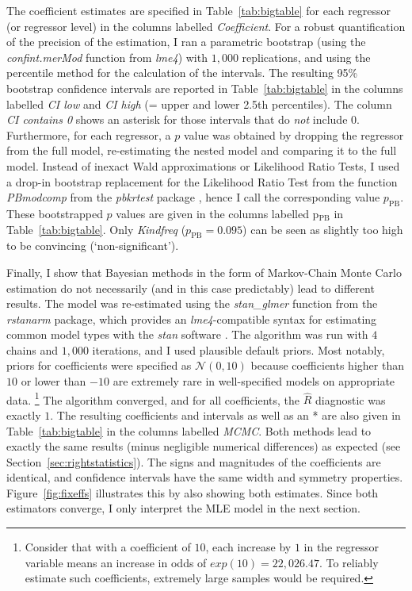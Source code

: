 \documentclass[USenglish]{article}
\newcommand{\Sub}[1]{\ensuremath{\mathrm{_{#1}}}}
\newcommand{\mpPB}{\ensuremath{p_{\text{PB}}}}
\begin{document}
The coefficient estimates are specified in Table~\ref{tab:bigtable} for each regressor (or regressor level) in the columns labelled \textit{Coefficient}.
For a robust quantification of the precision of the estimation, I ran a parametric bootstrap (using the \textit{confint.merMod} function from \textit{lme4}) with $1,000$ replications, and using the percentile method for the calculation of the intervals.
The resulting 95\% bootstrap confidence intervals are reported in Table~\ref{tab:bigtable} in the columns labelled \textit{CI low} and \textit{CI high} (= upper and lower 2.5th percentiles).
The column \textit{CI contains 0} shows an asterisk for those intervals that do \textit{not} include 0.
Furthermore, for each regressor, a $p$ value was obtained by dropping the regressor from the full model, re-estimating the nested model and comparing it to the full model.
Instead of inexact Wald approximations or Likelihood Ratio Tests, I used a drop-in bootstrap replacement for the Likelihood Ratio Test from the function \textit{PBmodcomp} from the \textit{pbkrtest} package \citep{HalekohHojsgaard2014}, hence I call the corresponding value $p_{\text{PB}}$.
These bootstrapped $p$ values are given in the columns labelled p\Sub{PB} in Table~\ref{tab:bigtable}.
Only \textit{Kindfreq} ($\mpPB=0.095$) can be seen as slightly too high to be convincing (`non-significant').

Finally, I show that Bayesian methods in the form of Markov-Chain Monte Carlo estimation do not necessarily (and in this case predictably) lead to different results.
The model was re-estimated using the \textit{stan\_glmer} function from the \textit{rstanarm} package, which provides an \textit{lme4}-compatible syntax for estimating common model types with the \textit{stan} software \citep{CarpenterEa2017}.
The algorithm was run with $4$ chains and $1,000$ iterations, and I used plausible default priors.
Most notably, priors for coefficients were specified as $\mathcal{N}(0,10)$ because coefficients higher than $10$ or lower than $-10$ are extremely rare in well-specified models on appropriate data.%
\footnote{Consider that with a coefficient of $10$, each increase by $1$ in the regressor variable means an increase in odds of $exp(10)=22,026.47$.
To reliably estimate such coefficients, extremely large samples would be required.}
The algorithm converged, and for all coefficients, the $\hat{R}$ diagnostic was exactly $1$.
The resulting coefficients and intervals as well as an * are also given in Table~\ref{tab:bigtable} in the columns labelled \textit{MCMC}.
Both methods lead to exactly the same results (minus negligible numerical differences) as expected (see Section~\ref{sec:rightstatistics}).
The signs and magnitudes of the coefficients are identical, and confidence intervals have the same width and symmetry properties.
Figure~\ref{fig:fixeffs} illustrates this by also showing both estimates.
Since both estimators converge, I only interpret the MLE model in the next section.
\end{document}
